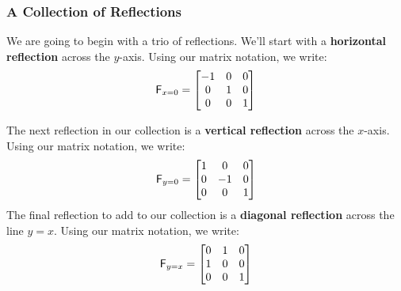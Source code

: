 \subsubsection{A Collection of Reflections}

We are going to begin with a trio of reflections. We'll start with a
\textbf{horizontal reflection} across the $y$-axis.  Using
our matrix notation, we write:
\[
\mathsf{F}_{x=0} =
\begin{bmatrix}
-1 & 0 & 0\\
 0 & 1 & 0\\
 0 & 0 & 1
\end{bmatrix}
\]

The next reflection in our collection is a \textbf{vertical
  reflection}
across the $x$-axis.  Using our matrix notation, we write:
\[
\mathsf{F}_{y=0} =
\begin{bmatrix}
1 &  0 & 0\\
0 & -1 & 0\\
0 &  0 & 1
\end{bmatrix}
\]
The final reflection to add to our collection is a \textbf{diagonal
  reflection}
across the line $y=x$.  Using our matrix notation, we write:
\[
\mathsf{F}_{y=x} =
\begin{bmatrix}
0 & 1 & 0\\
1 & 0 & 0\\
0 & 0 & 1
\end{bmatrix}
\]


